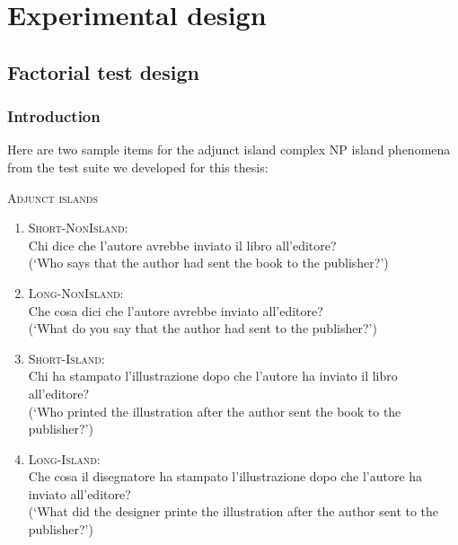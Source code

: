 \chapter{Experimental design}

\section{Factorial test design}

\subsection{Introduction}

Here are two sample items for the adjunct island complex NP island phenomena from the test suite we developed for this thesis:

\begin{example}
	\textsc{Adjunct islands}
	\renewcommand{\labelenumi}{\alph{enumi}.}
	\begin{enumerate}
		\item \textsc{Short-NonIsland:} \\
		Chi dice che l’autore avrebbe inviato il libro all’editore? \\
		(`Who says that the author had sent the book to the publisher?')
		\item \textsc{Long-NonIsland:} \\
		Che cosa dici che l'autore avrebbe inviato all’editore? \\
		(`What do you say that the author had sent to the publisher?')
		\item \textsc{Short-Island:} \\
		Chi ha stampato l’illustrazione dopo che l'autore ha inviato il libro all’editore? \\
		(`Who printed the illustration after the author sent the book to the publisher?')
		\item \textsc{Long-Island:} \\				
		Che cosa il disegnatore ha stampato l’illustrazione dopo che l'autore ha inviato all’editore? \\
		(`What did the designer printe the illustration after the author sent to the publisher?')
	\end{enumerate}
	\label{adjunct_item_1}
\end{example}

